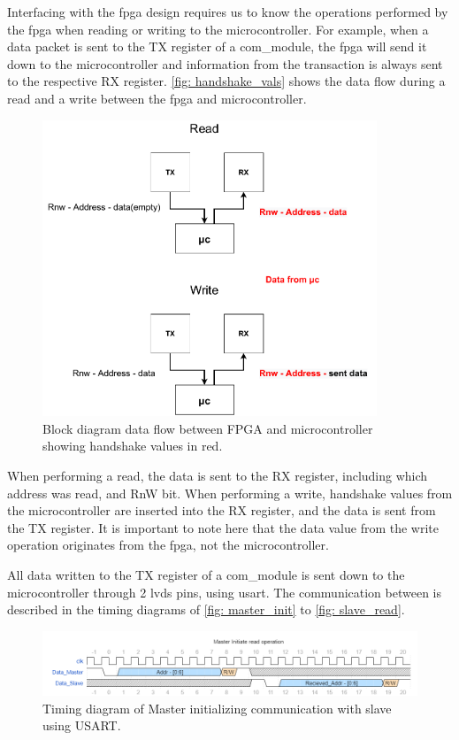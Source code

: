\documentclass[main.tex]{subfiles}
\begin{document}
Interfacing with the \gls{fpga} design requires us to know the operations performed by the \gls{fpga} when reading or writing to the microcontroller. For example, when a data packet is sent to the TX register of a com\_module, the \gls{fpga} will send it down to the microcontroller and information from the transaction is always sent to the respective RX register. \autoref{fig: handshake_vals} shows the data flow during a read and a write between the \gls{fpga} and microcontroller.

\begin{figure}[!htpb]
    \centering
    \includegraphics[width=10cm, scale=1]{images/handshake procedure.pdf}
    \caption{Block diagram data flow between FPGA and microcontroller showing handshake values in red.}
    \label{fig: handshake_vals}
\end{figure}
\FloatBarrier

When performing a read, the data is sent to the RX register, including which address was read, and RnW bit. When performing a write, handshake values from the microcontroller are inserted into the RX register, and the data is sent from the TX register. It is important to note here that the data value from the write operation originates from the \gls{fpga}, not the microcontroller.

All data written to the TX register of a com\_module is sent down to the microcontroller through 2 \gls{lvds} pins, using \acrshort{usart}. The communication between is described in the timing diagrams of \autoref{fig: master_init} to \autoref{fig: slave_read}\cite{birger}.

\begin{figure}[!htpb]
    \centering
    \includegraphics[width=15cm, scale=1]{images/MasterInitRead.png}
    \caption{Timing diagram of Master initializing communication with slave using USART.}
    \label{fig: master_init}
\end{figure}
\FloatBarrier
\end{document}
